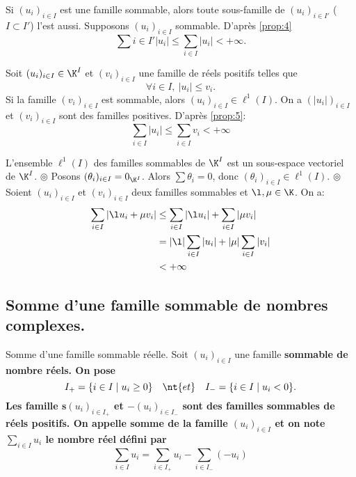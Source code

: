 \documentclass[11pt]{article}
\begin{document}
\begin{prop}{}{}
    Si $(u_i)_{i\in I}$ est une famille sommable, alors toute sous-famille de $(u_i)_{i\in I'}$ ($I\subset I'$) l'est aussi.
    \tcblower
    Supposons $(u_i)_{i\in I}$ sommable. D'après \ref{prop:4}
    \begin{equation*}
        \sum{i\in I'}|u_i|\leq\sum_{i\in I}|u_i|<+\infty.
    \end{equation*}
\end{prop}

\begin{prop}{}{}
    Soit $(u_i)_{i\in I}\in\K^I$ et $(v_i)_{i\in I}$ une famille de réels positifs telles que
    \begin{equation*}
        \forall i \in I, ~ |u_i|\leq v_i.
    \end{equation*}
    Si la famille $(v_i)_{i\in I}$ est sommable, alors $(u_i)_{i\in I}\in\ell^1(I)$.
    \tcblower
    On a $(|u_i|)_{i\in I}$ et $(v_i)_{i\in I}$ sont des familles positives. D'après \ref{prop:5}:
    \begin{equation*}
        \sum_{i\in I}|u_i|\leq\sum_{i\in I}v_i < +\infty
    \end{equation*}
\end{prop}

\begin{prop}{}{}
    L'ensemble $\ell^1(I)$ des familles sommables de $\K^I$ est un sous-espace vectoriel de $\K^I$.
    \tcblower
    $\circledcirc$ Posons $(\theta_i)_{i\in I}=0_{\K^I}$. Alors $\sum\theta_i=0$, donc $(\theta_i)_{i\in I}\in\ell^1(I)$.\n
    $\circledcirc$ Soient $(u_i)_{i\in I}$ et $(v_i)_{i\in I}$ deux familles sommables et $\l,\mu\in\K$. On a:
    \begin{align*}
        \sum_{i\in I}\left| \l u_i + \mu v_i \right| &\leq \sum_{i\in I}|\l u_i| + \sum_{i\in I}|\mu v_i|\\
        &= |\l|\sum_{i\in I}|u_i| + |\mu|\sum_{i\in I}|v_i|\\
        &< +\infty
    \end{align*}
\end{prop}

\subsection{Somme d'une famille sommable de nombres complexes.}

\begin{defi}{Somme d'une famille sommable réelle.}{}
    Soit $(u_i)_{i\in I}$ une famille \bf{sommable} de nombre réels. On pose
    \begin{equation*}
        I_+=\{i\in I\mid u_i\geq0\}\quad\nt{et}\quad I_-=\{i\in I\mid u_i<0\}.
    \end{equation*}
    Les famille s$(u_i)_{i\in I_+}$ et $-(u_i)_{i\in I_-}$ sont des familles sommables de réels positifs.\n
    On appelle \bf{somme} de la famille $(u_i)_{i\in I}$ et on note $\sum\limits_{i\in I}u_i$ le nombre réel défini par
    \begin{equation*}
        \sum_{i\in I}u_i=\sum_{i\in I_+}u_i - \sum_{i\in I_-}(-u_i)
    \end{equation*}
\end{defi}
\end{document}
